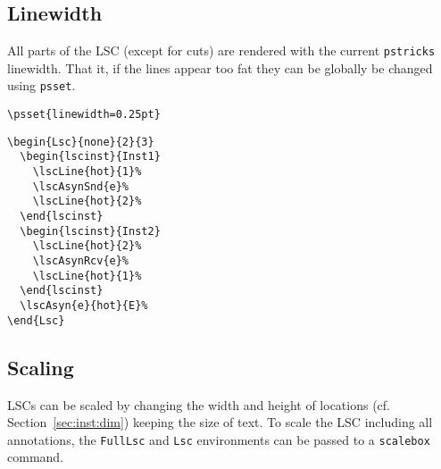 \documentclass{article}
\newcommand{\bs}{\usebox{\bsbox}}
\newcommand{\env}[1]{\texttt{#1}}
\newcommand{\cmd}[1]{\bs\texttt{#1}}
\newcommand{\mFullLsc}{\env{FullLsc}}
\newcommand{\mLsc}{\env{Lsc}}
\newcommand{\pstricks}{\texttt{pstricks}}
\begin{document}
\subsection{Linewidth}
\label{sec:tricks:lines}

All parts of the LSC (except for cuts) are rendered with the current
\pstricks{} 
linewidth.
%
That it, if the lines appear too 
fat they can be globally be changed using
\cmd{psset}.

\begin{center}%
\begin{minipage}{0.45\textwidth}
\end{minipage}
\hfill
\begin{minipage}{0.35\textwidth}%
\small%
{\begin{verbatim}
\psset{linewidth=0.25pt}
\end{verbatim}}%
\verbunskip%
{\gray\begin{verbatim}
\begin{Lsc}{none}{2}{3}
  \begin{lscinst}{Inst1}
    \lscLine{hot}{1}%
    \lscAsynSnd{e}%
    \lscLine{hot}{2}%
  \end{lscinst}
  \begin{lscinst}{Inst2}
    \lscLine{hot}{2}%
    \lscAsynRcv{e}%
    \lscLine{hot}{1}%
  \end{lscinst}
  \lscAsyn{e}{hot}{E}%
\end{Lsc}
\end{verbatim}}%
\end{minipage}
\end{center}%>@>
%>@>

\subsection{Scaling}
\label{sec:tricks:scaling}

LSCs can be 
scaled by changing the width and height of locations (cf.
Section~\ref{sec:inst:dim}) keeping the size of text.
%
To scale the LSC including all annotations, the \mFullLsc{} and \mLsc{}
environments can be passed to a 
\cmd{scalebox} command.
\end{document}
